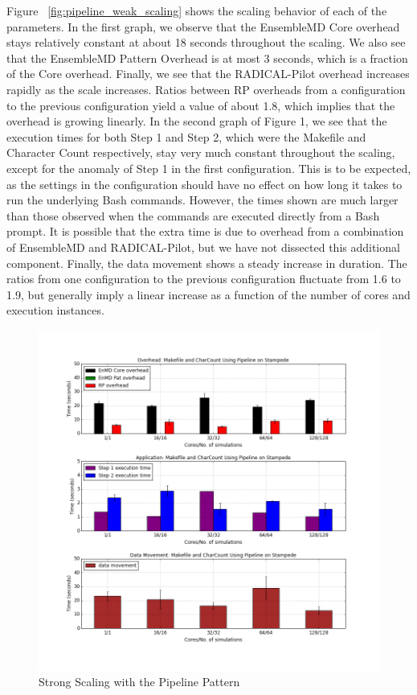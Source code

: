 \documentclass[]{article}
\begin{document}
		Figure ~\ref{fig:pipeline_weak_scaling} shows the scaling behavior of each of the parameters. In the first graph, we observe that the EnsembleMD Core overhead stays relatively constant at about 18 seconds throughout the scaling. We also see that the EnsembleMD Pattern Overhead is at most 3 seconds, which is a fraction of the Core overhead. Finally, we see that the RADICAL-Pilot overhead increases rapidly as the scale increases. Ratios between RP overheads from a configuration to the previous configuration yield a value of about 1.8, which implies that the overhead is growing linearly.
		In the second graph of Figure 1, we see that the execution times for both Step 1 and Step 2, which were the Makefile and Character Count respectively, stay very much constant throughout the scaling, except for the anomaly of Step 1 in the first configuration. This is to be expected, as the settings in the configuration should have no effect on how long it takes to run the underlying Bash commands. However, the times shown are much larger than those observed when the commands are executed directly from a Bash prompt. It is possible that the extra time is due to overhead from a combination of EnsembleMD and RADICAL-Pilot, but we have not dissected this additional component.
		Finally, the data movement shows a steady increase in duration. The ratios from one configuration to the previous configuration fluctuate from 1.6 to 1.9, but generally imply a linear increase as a function of the number of cores and execution instances. 


		\begin{figure}[H]
			\centering
			\includegraphics[scale=.30]{iteration_3/pipeline_strong_scaling.png}
			\caption{Strong Scaling with the Pipeline Pattern}
			\label{fig:pipeline_strong_scaling}
		\end{figure}
\end{document}
